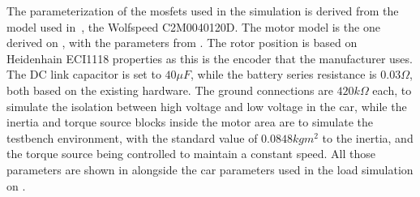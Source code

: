 The parameterization of the \glspl{mosfet} used in the simulation is derived from the model used in~\cite{Costa:MSc}, the  Wolfspeed C2M0040120D. The motor model is the one derived on , with the parameters from . The rotor position is based on Heidenhain ECI1118 properties as this is the encoder that the manufacturer uses. 
The DC link capacitor is set to $40\mu F$, while the battery series resistance is $0.03 \Omega$, both based on the existing hardware. The ground connections are $420k\Omega$ each, to simulate the isolation between high voltage and low voltage in the car, while the inertia and torque source blocks inside the motor area are to simulate the testbench environment, with the standard value of $0.0848 kg m^2$ to the inertia, and the torque source being controlled to maintain a constant speed. All those parameters are shown in  alongside the car parameters used in the load simulation on .

